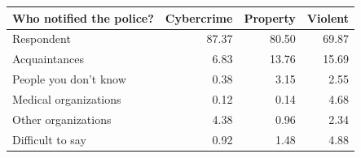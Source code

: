 \begin{table}[t]
\fontsize{12.0pt}{14.0pt}\selectfont
\begin{tabular*}{\linewidth}{@{\extracolsep{\fill}}lrrr}
\toprule
Who notified the police? & Cybercrime & Property & Violent \\ 
\midrule\addlinespace[2.5pt]
Respondent & 87.37 & 80.50 & 69.87 \\ 
Acquaintances & 6.83 & 13.76 & 15.69 \\ 
People you don't know & 0.38 & 3.15 & 2.55 \\ 
Medical organizations & 0.12 & 0.14 & 4.68 \\ 
Other organizations & 4.38 & 0.96 & 2.34 \\ 
Difficult to say & 0.92 & 1.48 & 4.88 \\ 
\bottomrule
\end{tabular*}
\end{table}
